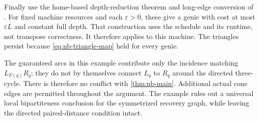 \begin{informalproof}
Finally use the home-based depth-reduction theorem and long-edge
conversion of \cite[Theorem~B and the proof of Corollary~B]{BrendeCurved}.
For fixed machine resources and each $\varepsilon>0$, these give a
genie with cost at most $\varepsilon L$ and constant full depth.
That construction uses the schedule and its runtime, not transpose
correctness.  It therefore applies to this machine.  The triangles
persist because \eqref{eq:nb-triangle-map} held for every genie.
\end{informalproof}

The guaranteed arcs in this example contribute only the incidence
matching $L_{F(q)}R_q$; they do not by themselves connect $L_q$ to
$R_q$ around the directed three-cycle.  There is therefore no conflict
with \cref{thm:nb-main}.  Additional actual cone edges are permitted
throughout the argument.  The example rules out a universal local
bipartiteness conclusion for the symmetrized recovery graph, while
leaving the directed paired-distance condition intact.
